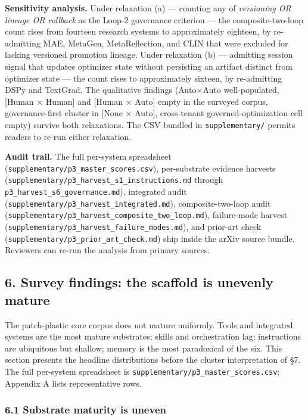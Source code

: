 \documentclass[
]{article}
\begin{document}
\textbf{Sensitivity analysis.} Under relaxation (a) --- counting any of
\emph{versioning OR lineage OR rollback} as the Loop-2 governance
criterion --- the composite-two-loop count rises from fourteen research
systems to approximately eighteen, by re-admitting MAE, MetaGen,
MetaReflection, and CLIN that were excluded for lacking versioned
promotion lineage. Under relaxation (b) --- admitting session signal
that updates optimizer state without persisting an artifact distinct
from optimizer state --- the count rises to approximately sixteen, by
re-admitting DSPy and TextGrad. The qualitative findings (Auto×Auto
well-populated, {[}Human × Human{]} and {[}Human × Auto{]} empty in the
surveyed corpus, governance-first cluster in {[}None × Auto{]},
cross-tenant governed-optimization cell empty) survive both relaxations.
The CSV bundled in \texttt{supplementary/} permits readers to re-run
either relaxation.

\textbf{Audit trail.} The full per-system spreadsheet
(\texttt{supplementary/p3\_master\_scores.csv}), per-substrate evidence
harvests (\texttt{supplementary/p3\_harvest\_s1\_instructions.md}
through \texttt{p3\_harvest\_s6\_governance.md}), integrated audit
(\texttt{supplementary/p3\_harvest\_integrated.md}), composite-two-loop
audit (\texttt{supplementary/p3\_harvest\_composite\_two\_loop.md}),
failure-mode harvest
(\texttt{supplementary/p3\_harvest\_failure\_modes.md}), and prior-art
check (\texttt{supplementary/p3\_prior\_art\_check.md}) ship inside the
arXiv source bundle. Reviewers can re-run the analysis from primary
sources.

\subsection{6. Survey findings: the scaffold is unevenly
mature}\label{survey-findings-the-scaffold-is-unevenly-mature}

The patch-plastic core corpus does not mature uniformly. Tools and
integrated systems are the most mature substrates; skills and
orchestration lag; instructions are ubiquitous but shallow; memory is
the most paradoxical of the six. This section presents the headline
distributions before the cluster interpretation of §7. The full
per-system spreadsheet is \texttt{supplementary/p3\_master\_scores.csv};
Appendix A lists representative rows.

\subsubsection{6.1 Substrate maturity is
uneven}\label{substrate-maturity-is-uneven}
\end{document}
